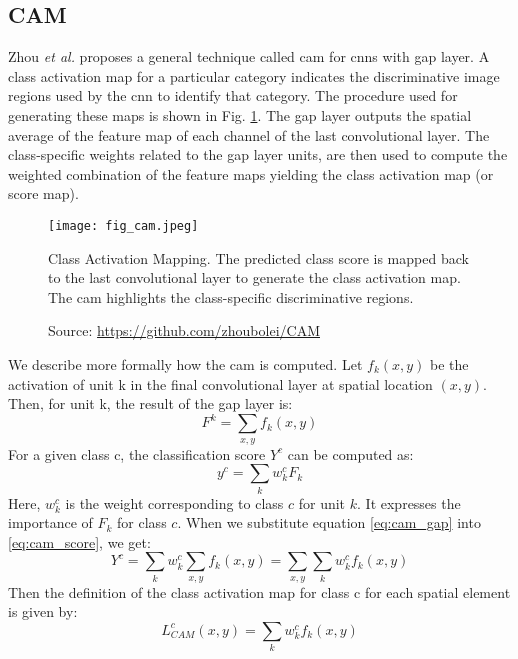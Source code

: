 \subsection{CAM}
Zhou \textit{et al.} proposes a general technique called \acrfull{cam} for \acrshort{cnn}s with \acrshort{gap} layer. A class activation map for a particular category indicates the discriminative image regions used by the
\acrshort{cnn} to identify that category. The procedure used for generating these maps is shown in Fig. \ref{fig:cam}. The \acrshort{gap} layer outputs the spatial average of the feature map of each channel of the last convolutional layer. The class-specific weights related to the \acrshort{gap} layer units, are then used to compute the weighted combination of the feature maps yielding the class activation map (or score map).
\begin{figure}[ht]
    \begin{center}       
    \texttt{[image: fig\_cam.jpeg]}
    \caption[Class Activation Mapping]{Class Activation Mapping. The predicted class score is mapped back to the last convolutional layer to generate the class activation map. The \acrshort{cam} highlights the class-specific discriminative regions.}
    \caption*{Source: \href{https://github.com/zhoubolei/CAM}{https://github.com/zhoubolei/CAM}}
    \label{fig:cam}
    \end{center}
\end{figure}

We describe more formally how the \acrshort{cam} is computed. Let $f_{k}(x,y)$ be the activation of unit k in the final convolutional layer at spatial location $(x,y)$. Then, for unit k, the result of the \acrshort{gap} layer is:
\begin{equation} \label{eq:cam_gap}
    F^{k} = \sum_{x,y}f_{k}(x,y)
\end{equation}
For a given class c, the classification score $Y^{c}$ can be computed as:
\begin{equation} \label{eq:cam_score}
    y^{c} = \sum_{k}w_{k}^{c}F_{k}
\end{equation}
Here, $w_{k}^{c}$ is the weight corresponding to class $c$ for unit $k$. It expresses the importance of $F_{k}$ for class $c$.
When we substitute equation \ref{eq:cam_gap} into \ref{eq:cam_score}, we get:
\begin{equation} \label{eq:cam_score2}
    Y^{c} = \sum_{k}w_{k}^{c}\sum_{x,y}f_{k}(x,y) = \sum_{x,y}\sum_{k}w_{k}^{c}f_{k}(x,y)
\end{equation}
Then the definition of the class activation map for class c for each spatial element is given by:
\begin{equation} \label{eq:cam_map}
    L_{CAM}^{c}(x,y) = \sum_{k}w_{k}^{c}f_{k}(x,y)
\end{equation}

